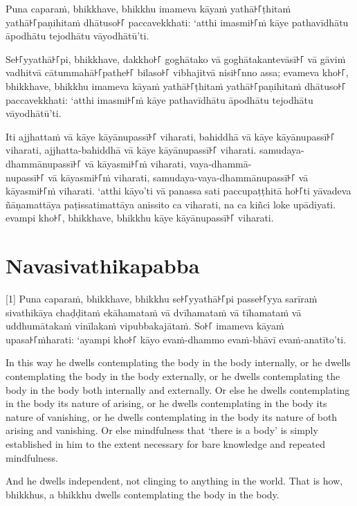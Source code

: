 Puna caparaṁ, bhikkhave, bhikkhu imameva kāyaṁ yathā꜔꜒ṭhitaṁ yathā꜔꜒paṇihitaṁ
dhātuso꜔꜒ paccavekkhati: ‘atthi imasmi꜔꜒ṁ kāye pathavīdhātu āpodhātu tejodhātu
vāyodhātū’ti.

Se꜔꜒yyathā꜔꜒pi, bhikkhave, dakkho꜔꜒ goghātako vā goghātakantevāsī꜔꜒ vā gāviṁ vadhitvā
cātummahā꜔꜒pathe꜔꜒ bilaso꜔꜒ vibhajitvā nisi꜔꜒nno assa; evameva kho꜔꜒, bhikkhave, bhikkhu
imameva kāyaṁ yathā꜔꜒ṭhitaṁ yathā꜔꜒paṇihitaṁ dhātuso꜔꜒ paccavekkhati: ‘atthi imasmi꜔꜒ṁ
kāye pathavīdhātu āpodhātu tejodhātu vāyodhātū’ti.

Iti ajjhattaṁ vā kāye kāyānupassī꜔꜒ viharati, bahiddhā vā kāye kāyānupassī꜔꜒
viharati, ajjhatta-bahiddhā vā kāye kāyānupassī꜔꜒ viharati. samudaya-dhammānupassī꜔꜒
vā kāyasmi꜔꜒ṁ viharati, vaya-dhammā-\\
nupassī꜔꜒ vā kāyasmi꜔꜒ṁ viharati, samudaya-vaya-dhammānupassī꜔꜒ vā kāyasmi꜔꜒ṁ viharati.
‘atthi kāyo’ti vā panassa sati paccupaṭṭhitā ho꜔꜒ti yāvadeva ñāṇamattāya
paṭissatimattāya anissito ca viharati, na ca kiñci loke upādiyati. evampi kho꜔꜒,
bhikkhave, bhikkhu kāye kāyānupassī꜔꜒ viharati.


\section*{Navasivathikapabba}

[1] Puna caparaṁ, bhikkhave, bhikkhu se꜔꜒yyathā꜔꜒pi passe꜔꜒yya sarīraṁ sivathikāya
chaḍḍitaṁ ekāhamataṁ vā dvīhamataṁ vā tīhamataṁ vā uddhumātakaṁ vinīlakaṁ
vipubbakajātaṁ. So꜔꜒ imameva kāyaṁ upasa꜔꜒ṁharati: ‘ayampi kho꜔꜒ kāyo evaṁ-dhammo
evaṁ-bhāvī evaṁ-anatīto’ti.

\englishPage

In this way he dwells contemplating the body in the body internally, or he
dwells contemplating the body in the body externally, or he dwells contemplating
the body in the body both internally and externally. Or else he dwells
contemplating in the body its nature of arising, or he dwells contemplating in
the body its nature of vanishing, or he dwells contemplating in the body its
nature of both arising and vanishing. Or else mindfulness that ‘there is a body’
is simply established in him to the extent necessary for bare knowledge and
repeated mindfulness.

And he dwells independent, not clinging to anything in the world. That is how,
bhikkhus, a bhikkhu dwells contemplating the body in the body.

